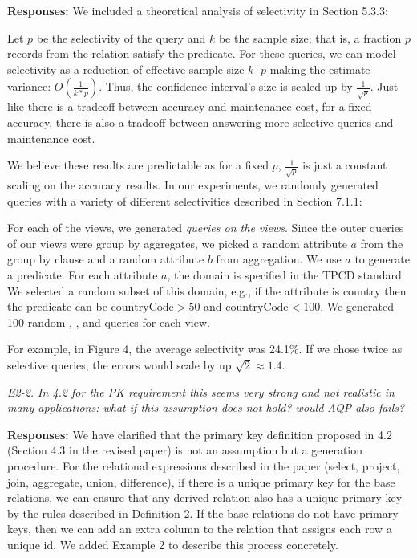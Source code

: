 {\bf Responses:} We included a theoretical analysis of selectivity in Section 5.3.3:
\begin{displayquote}
Let $p$ be the selectivity of the query and $k$ be the sample size; that is, a fraction $p$ records from the relation satisfy the predicate.
For these queries, we can model selectivity as a reduction of effective sample size $k\cdot p$ making the
estimate variance: $O(\frac{1}{k*p})$.
Thus, the confidence interval's size is scaled up by $\frac{1}{\sqrt{p}}$.
Just like there is a tradeoff between accuracy and maintenance cost, for a fixed accuracy, 
there is also a tradeoff between answering more selective queries and maintenance cost.
\end{displayquote}
We believe these results are predictable as for a fixed $p$, $\frac{1}{\sqrt{p}}$ is just a constant scaling on the accuracy results.
In our experiments, we randomly generated queries with a variety of different selectivities described in Section 7.1.1:
\begin{displayquote}
For each of the views, we generated \emph{queries on the views}.
Since the outer queries of our views were group by aggregates, we picked a random attribute $a$ from the group by clause and a random attribute $b$ from aggregation.
We use $a$ to generate a predicate.
For each attribute $a$, the domain is specified in the TPCD standard.
We selected a random subset of this domain, e.g., if the attribute is country then the predicate can be $\text{countryCode} > 50$ and $\text{countryCode} < 100$.
We generated 100 random \sumfunc, \avgfunc, and \countfunc queries for each view.
\end{displayquote}
For example, in Figure 4, the average selectivity was 24.1\%.
If we chose twice as selective queries, the errors would scale by up $\sqrt{2} \approx 1.4$.

\vspace{1em}

\emph{E2-2. In 4.2 for the PK requirement  this seems very strong and not realistic in many applications: what if this assumption does not hold? would AQP also fails?}

\vspace{.25em}

{\bf Responses:} We have clarified that the primary key definition proposed in 4.2 (Section 4.3 in the revised paper) is not an assumption but a generation procedure. For the relational expressions described in the paper (select, project, join, aggregate, union, difference), if there is a unique primary key for the base relations, we can ensure that any derived relation also has a unique primary key by the rules described in Definition 2. If the base relations do not have primary keys, then we can add an extra column to the relation that assigns each row a unique id. We added Example 2 to describe this process concretely.

